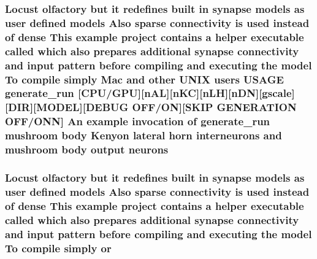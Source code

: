 \hypertarget{userproject_2MBody__userdef__project_2README_8txt_a40eee27bfd7f70218d52a0b2bafccba2}{
\subsubsection[{neurons}]{\setlength{\rightskip}{0pt plus 5cm}Locust olfactory but {\bf it} redefines built {\bf in} synapse models as user defined models Also sparse connectivity {\bf is} used instead of dense This example {\bf project} contains a helper executable called which also prepares additional synapse connectivity and input pattern before compiling and executing the {\bf model} To compile simply Mac and other U\+N\+I\+X users U\+S\+A\+G\+E {\bf generate\+\_\+run} \mbox{[}{\bf C\+P\+U}/{\bf G\+P\+U}\mbox{]}\mbox{[}n\+A\+L\mbox{]}\mbox{[}n\+K\+C\mbox{]}\mbox{[}n\+L\+H\mbox{]}\mbox{[}n\+D\+N\mbox{]}\mbox{[}gscale\mbox{]}\mbox{[}D\+I\+R\mbox{]}\mbox{[}M\+O\+D\+E\+L\mbox{]}\mbox{[}D\+E\+B\+U\+G O\+F\+F/O\+N\mbox{]}\mbox{[}S\+K\+I\+P G\+E\+N\+E\+R\+A\+T\+I\+O\+N O\+F\+F/O\+N\+N\mbox{]} An example invocation of {\bf generate\+\_\+run} mushroom body Kenyon lateral horn {\bf interneurons} and mushroom body output neurons}}\label{userproject_2MBody__userdef__project_2README_8txt_a40eee27bfd7f70218d52a0b2bafccba2}
\hypertarget{userproject_2MBody__userdef__project_2README_8txt_a262ed8e4e0bdc8dd97213d657e77bdd4}{
\subsubsection[{or}]{\setlength{\rightskip}{0pt plus 5cm}Locust olfactory but {\bf it} redefines built {\bf in} synapse models as user defined models Also sparse connectivity {\bf is} used instead of dense This example {\bf project} contains a helper executable called which also prepares additional synapse connectivity and input pattern before compiling and executing the {\bf model} To compile simply or}}\label{userproject_2MBody__userdef__project_2README_8txt_a262ed8e4e0bdc8dd97213d657e77bdd4}
